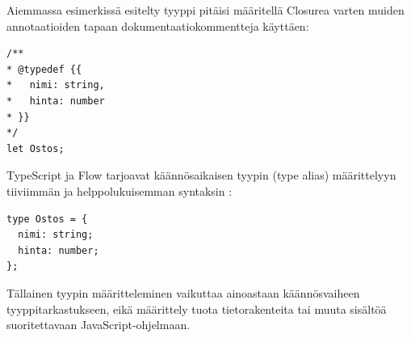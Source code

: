 Aiemmassa esimerkissä esitelty tyyppi  pitäisi
määritellä Closurea varten muiden annotaatioiden tapaan dokumentaatiokommentteja käyttäen:

\begin{lstlisting}[label={lst:closure_typedef}]
/**
* @typedef {{
*   nimi: string,
*   hinta: number
* }}
*/
let Ostos;
\end{lstlisting}
TypeScript ja Flow tarjoavat käännösaikaisen tyypin (type alias)
määrittelyyn tiiviimmän ja helppolukuisemman syntaksin \cite{TypeScriptSpec}:
\begin{lstlisting}[label={lst:ts_flow_type_alias}]
type Ostos = {
  nimi: string;
  hinta: number;
};
\end{lstlisting}
Tällainen tyypin määritteleminen vaikuttaa ainoastaan käännösvaiheen
tyyppitarkastukseen, eikä määrittely tuota tietorakenteita tai muuta
sisältöä suoritettavaan JavaScript-ohjelmaan.

